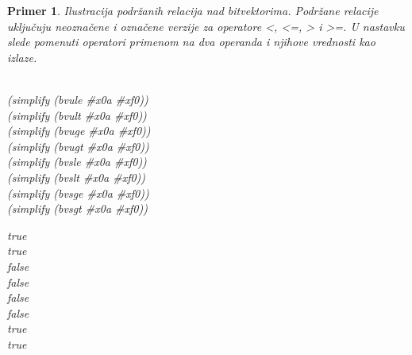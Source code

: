 \documentclass[12pt,oneside]{memoir}
\newtheorem{primer}{Primer}
\begin{document}
\begin{primer} Ilustracija podržanih relacija nad bitvektorima. Podržane relacije uključuju neoznačene i označene verzije za operatore <, <=, > i >=. U nastavku slede pomenuti operatori primenom na dva operanda i njihove vrednosti kao izlaze.
\\ \\ 
\begin{minipage}[b]{0.5\textwidth}
(simplify (bvule \#x0a \#xf0))  
\\(simplify (bvult \#x0a \#xf0))  
\\(simplify (bvuge \#x0a \#xf0))  
\\(simplify (bvugt \#x0a \#xf0))  
\\(simplify (bvsle \#x0a \#xf0)) 
\\(simplify (bvslt \#x0a \#xf0))  
\\(simplify (bvsge \#x0a \#xf0))  
\\(simplify (bvsgt \#x0a \#xf0))

\end{minipage}
\hspace{2cm} 
\begin{minipage}[t]{0.5\textwidth}
\vspace{-4.7cm}
true 
\\true 
\\false 
\\false 
\\false 
\\false 
\\true 
\\true
\end{minipage}


\end{primer}
\end{document}
